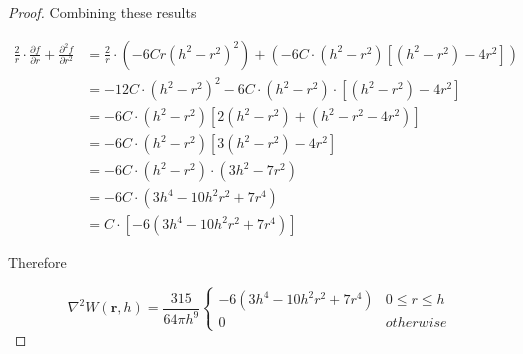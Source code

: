 \documentclass[12pt]{article}
\begin{document}
\begin{proof}
        Combining these results

        \begin{align*}
            \frac{2}{r} \cdot \frac{\partial f}{\partial r} + \frac{\partial^2 f}{\partial r^2}
            &= \frac{2}{r} \cdot \left(-6Cr(h^2 - r^2)^2\right) + \left(-6C \cdot (h^2 - r^2)\left[(h^2 - r^2) - 4r^2\right]\right) \\
            &= -12C \cdot (h^2 - r^2)^2 -6C \cdot (h^2 - r^2) \cdot \left[(h^2 - r^2) - 4r^2\right] \\
            &= -6C \cdot (h^2 - r^2) \left[2(h^2 - r^2) + (h^2 - r^2 - 4r^2)\right] \\
            &= -6C \cdot (h^2 - r^2) \left[3(h^2 - r^2) - 4r^2\right] \\
            &= -6C \cdot (h^2 - r^2) \cdot (3h^2 - 7r^2) \\
            &= -6C \cdot (3h^4 - 10h^2r^2 + 7r^4) \\
            &= C \cdot \left[-6(3h^4 - 10h^2r^2 + 7r^4)\right]
        \end{align*}

        Therefore

        $$\nabla^2 W(\textbf{r}, h) = \frac{315}{64\pi{h}^9}
        \begin{cases}
            -6(3h^4 - 10h^2r^2 + 7r^4) & 0 \leq r \leq h \\
            0 & otherwise
        \end{cases}$$
    \end{proof}
\end{document}
